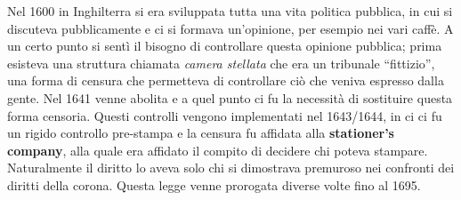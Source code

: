 Nel 1600 in Inghilterra si era sviluppata tutta una vita politica pubblica, in cui si discuteva pubblicamente e ci si formava un'opinione, per esempio nei vari caffè. A un certo punto si sentì il bisogno di controllare questa opinione pubblica; prima esisteva una struttura chiamata \textit{camera stellata} che era un tribunale ``fittizio'', una forma di censura che permetteva di controllare ciò che veniva espresso dalla gente. Nel 1641 venne abolita e a quel punto ci fu la necessità di sostituire questa forma censoria. Questi controlli vengono implementati nel 1643/1644, in ci ci fu un rigido controllo pre-stampa e la censura fu affidata alla \textbf{stationer's company}, alla quale era affidato il compito di decidere chi poteva stampare. Naturalmente il diritto lo aveva solo chi si dimostrava premuroso nei confronti dei diritti della corona. Questa legge venne prorogata diverse volte fino al 1695. 